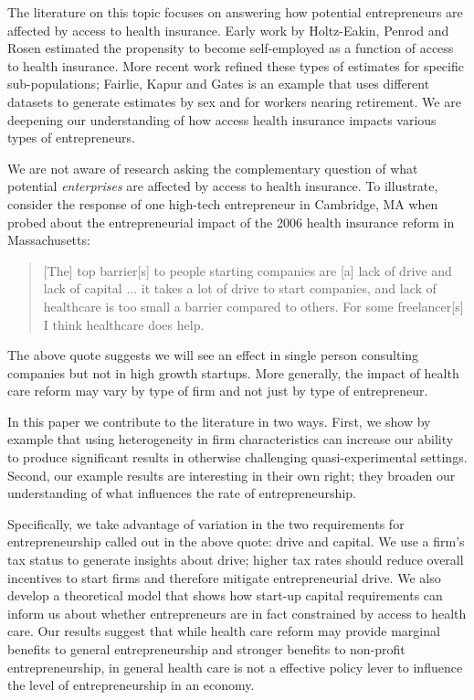 \documentclass[12pt]{article}
\begin{document}
The literature on this topic focuses on answering how potential entrepreneurs are affected by access to health insurance. Early work by Holtz-Eakin, Penrod and Rosen \cite{holtz_health}  estimated the propensity to become self-employed as a function of access to health insurance. More recent work refined these types of estimates for specific sub-populations; Fairlie, Kapur and Gates \cite{fairlie_health} is an example that uses different datasets to generate estimates by sex and for workers nearing retirement. We are deepening our understanding of how access health insurance impacts various types of entrepreneurs. 

We are not aware of research asking the complementary question of what potential \emph{enterprises} are affected by access to health insurance. To illustrate, consider the response of one high-tech entrepreneur in Cambridge, MA when probed about the entrepreneurial impact of the 2006 health insurance reform in Massachusetts:
\begin{quote}
[The] top barrier[s] to people starting companies are [a] lack of drive and lack of capital ... it takes a lot of drive to start companies, and lack of healthcare is too small a barrier compared to others. For some freelancer[s] I think healthcare does help.
\end{quote}
The above quote suggests we will see an effect in single person consulting companies but not in high growth startups. More generally, the impact of health care reform may vary by type of firm and not just by type of entrepreneur. 

In this paper we contribute to the literature in two ways. First, we show by example that using heterogeneity in firm characteristics can increase our ability to produce significant results in otherwise challenging quasi-experimental settings. Second, our example results are interesting in their own right; they broaden our understanding of what influences the rate of entrepreneurship. 

Specifically, we take advantage of variation in the two requirements for entrepreneurship called out in the above quote: drive and capital. We use a firm's tax status to generate insights about drive; higher tax rates should reduce overall incentives to start firms and therefore mitigate entrepreneurial drive. We also develop a theoretical model that shows how start-up capital requirements can inform us about whether entrepreneurs are in fact constrained by access to health care. Our results suggest that while health care reform may provide marginal benefits to general entrepreneurship and stronger benefits to non-profit entrepreneurship, in general health care is not a effective policy lever to influence the level of entrepreneurship in an economy.
\end{document}
